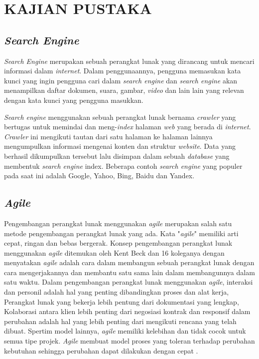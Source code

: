 
\chapter{KAJIAN PUSTAKA} 

\section{\textit{Search Engine}}
\textit{Search Engine} merupakan sebuah perangkat lunak yang dirancang untuk mencari informasi dalam \textit{internet}. Dalam penggunaannya, pengguna memasukan kata kunci yang ingin pengguna cari dalam \textit{search engine} dan \textit{search engine} akan menampilkan daftar dokumen, suara, gambar, \textit{video} dan lain lain yang relevan dengan kata kunci yang pengguna masukkan.

\textit{Search engine} menggunakan sebuah perangkat lunak bernama \textit{crawler} yang bertugas untuk memindai dan meng-\textit{index} halaman \textit{web} yang berada di \textit{internet}. \textit{Crawler} ini mengikuti tautan dari satu halaman ke halaman lainnya mengumpulkan informasi mengenai konten dan struktur \textit{website}. Data yang berhasil dikumpulkan tersebut lalu disimpan dalam sebuah \textit{database} yang membentuk \textit{search engine} index. Beberapa contoh \textit{search engine} yang populer pada saat ini adalah Google, Yahoo, Bing, Baidu dan Yandex.


\section{\textit{Agile}}
Pengembangan perangkat lunak menggunakan \textit{agile} merupakan salah satu metode pengembangan perangkat lunak yang ada. Kata "\textit{agile}" memiliki arti cepat, ringan dan bebas bergerak. Konsep pengembangan perangkat lunak menggunakan \textit{agile} ditemukan oleh Kent Beck dan 16 koleganya dengan menyatakan \textit{agile} adalah cara dalam membangun sebuah perangkat lunak dengan cara mengerjakannya dan membantu satu sama lain dalam membangunnya dalam satu waktu. Dalam pengembangan perangkat lunak menggunakan \textit{agile}, interaksi dan personil adalah hal yang penting dibandingkan proses dan alat kerja, Perangkat lunak yang bekerja lebih pentung dari dokumentasi yang lengkap, Kolaborasi antara klien lebih penting dari negosiasi kontrak dan responsif dalam perubahan adalah hal yang lebih penting dari mengikuti rencana yang telah dibuat. Spertim model lainnya, \textit{agile} memiliki kelebihan dan tidak cocok untuk semua tipe projek. \textit{Agile} membuat model proses yang toleran terhadap perubahan kebutuhan sehingga perubahan dapat dilakukan dengan cepat \citep{scrum}.

